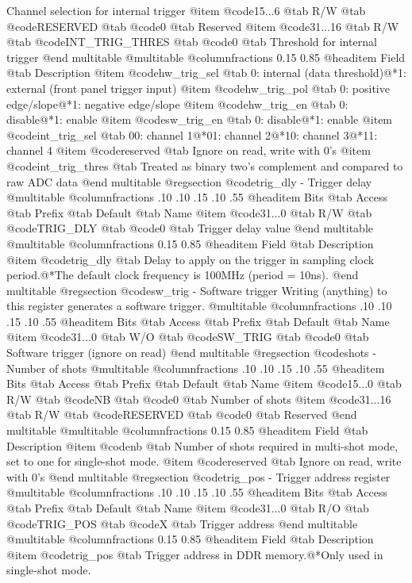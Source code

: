 Channel selection for internal trigger
@item @code{15...6}
@tab R/W @tab
@code{RESERVED}
@tab @code{0} @tab 
Reserved
@item @code{31...16}
@tab R/W @tab
@code{INT_TRIG_THRES}
@tab @code{0} @tab 
Threshold for internal trigger
@end multitable
@multitable @columnfractions 0.15 0.85
@headitem Field @tab Description
@item @code{hw_trig_sel} @tab 0: internal (data threshold)@*1: external (front panel trigger input)
@item @code{hw_trig_pol} @tab 0: positive edge/slope@*1: negative edge/slope
@item @code{hw_trig_en} @tab 0: disable@*1: enable
@item @code{sw_trig_en} @tab 0: disable@*1: enable
@item @code{int_trig_sel} @tab 00: channel 1@*01: channel 2@*10: channel 3@*11: channel 4
@item @code{reserved} @tab Ignore on read, write with 0's
@item @code{int_trig_thres} @tab Treated as binary two's complement and compared to raw ADC data
@end multitable
@regsection @code{trig_dly} - Trigger delay
@multitable @columnfractions .10 .10 .15 .10 .55
@headitem Bits @tab Access @tab Prefix @tab Default @tab Name
@item @code{31...0}
@tab R/W @tab
@code{TRIG_DLY}
@tab @code{0} @tab 
Trigger delay value
@end multitable
@multitable @columnfractions 0.15 0.85
@headitem Field @tab Description
@item @code{trig_dly} @tab Delay to apply on the trigger in sampling clock period.@*The default clock frequency is 100MHz (period = 10ns).
@end multitable
@regsection @code{sw_trig} - Software trigger
Writing (anything) to this register generates a software trigger.
@multitable @columnfractions .10 .10 .15 .10 .55
@headitem Bits @tab Access @tab Prefix @tab Default @tab Name
@item @code{31...0}
@tab W/O @tab
@code{SW_TRIG}
@tab @code{0} @tab 
Software trigger (ignore on read)
@end multitable
@regsection @code{shots} - Number of shots
@multitable @columnfractions .10 .10 .15 .10 .55
@headitem Bits @tab Access @tab Prefix @tab Default @tab Name
@item @code{15...0}
@tab R/W @tab
@code{NB}
@tab @code{0} @tab 
Number of shots
@item @code{31...16}
@tab R/W @tab
@code{RESERVED}
@tab @code{0} @tab 
Reserved
@end multitable
@multitable @columnfractions 0.15 0.85
@headitem Field @tab Description
@item @code{nb} @tab Number of shots required in multi-shot mode, set to one for single-shot mode.
@item @code{reserved} @tab Ignore on read, write with 0's
@end multitable
@regsection @code{trig_pos} - Trigger address register
@multitable @columnfractions .10 .10 .15 .10 .55
@headitem Bits @tab Access @tab Prefix @tab Default @tab Name
@item @code{31...0}
@tab R/O @tab
@code{TRIG_POS}
@tab @code{X} @tab 
Trigger address
@end multitable
@multitable @columnfractions 0.15 0.85
@headitem Field @tab Description
@item @code{trig_pos} @tab Trigger address in DDR memory.@*Only used in single-shot mode.
